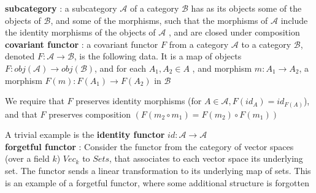 \documentclass{article}
\begin{document}
\textbf{subcategory} : a subcategory $\mathscr A$ of a category $\mathscr B$ has as its objects some of the objects of $\mathscr B$, and some of the morphisms, such that the morphisms of $\mathscr A$ include the identity morphisms of the objects of $\mathscr A$ , and are closed under composition
\\

\textbf{covariant functor} : a covariant functor $F$ from a category $\mathscr A$ to a category $\mathscr B$, denoted $F: \mathscr A \rightarrow \mathscr B$,
is the following data. It is a map of objects $F: obj(\mathscr A ) \rightarrow obj(\mathscr B)$, and for each $A_1, A_2 \in A$ , and morphism $m: A_1 \rightarrow A_2$, a morphism $F(m) : F(A_1) \rightarrow F(A_2)$ in $\mathscr B$

We require that $F$ preserves identity morphisms (for $A \in\mathscr A , F(id_A) = id_{F(A)}$), and that $F$ preserves composition $(F(m_2 \circ m_1) = F(m_2) \circ F(m_1))$

A trivial example is the \textbf{identity functor} $id:\mathscr A \rightarrow\mathscr A$\\

\textbf{forgetful functor} : Consider the functor from the category of
vector spaces (over a field $k$) $Vec_k$ to $Sets$, that associates to each vector space its underlying set. The functor sends a linear transformation to its underlying map of sets. This is an example of a forgetful functor, where some additional structure is forgotten
\end{document}
